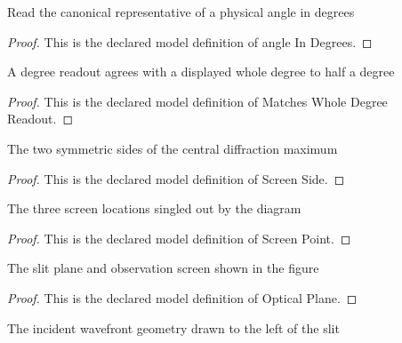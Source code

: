 \begin{definition}
  \label{def:physics:phyx-mini-0126:phyxminiproblems-problemphyxmini0126-angleindegrees}
  Read the canonical representative of a physical angle in degrees
\end{definition}
\begin{proof}
  This is the declared model definition of angle In Degrees.
\end{proof}
\begin{definition}
  \label{def:physics:phyx-mini-0126:phyxminiproblems-problemphyxmini0126-matcheswholedegreereadout}
  A degree readout agrees with a displayed whole degree to half a degree
\end{definition}
\begin{proof}
  This is the declared model definition of Matches Whole Degree Readout.
\end{proof}
\begin{definition}
  \label{def:physics:phyx-mini-0126:phyxminiproblems-problemphyxmini0126-screenside}
  The two symmetric sides of the central diffraction maximum
\end{definition}
\begin{proof}
  This is the declared model definition of Screen Side.
\end{proof}
\begin{definition}
  \label{def:physics:phyx-mini-0126:phyxminiproblems-problemphyxmini0126-screenpoint}
  The three screen locations singled out by the diagram
\end{definition}
\begin{proof}
  This is the declared model definition of Screen Point.
\end{proof}
\begin{definition}
  \label{def:physics:phyx-mini-0126:phyxminiproblems-problemphyxmini0126-opticalplane}
  The slit plane and observation screen shown in the figure
\end{definition}
\begin{proof}
  This is the declared model definition of Optical Plane.
\end{proof}
\begin{definition}
  \label{def:physics:phyx-mini-0126:phyxminiproblems-problemphyxmini0126-incidentwavefront}
  The incident wavefront geometry drawn to the left of the slit
\end{definition}
